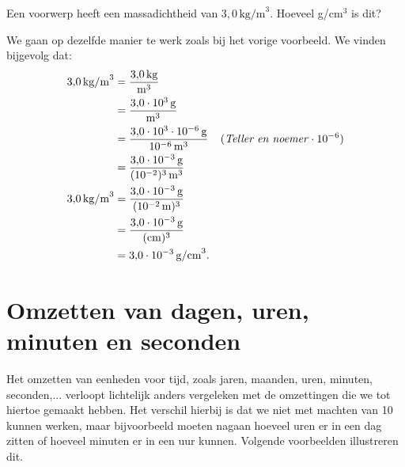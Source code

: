 \documentclass{ximera}
\begin{document}
\begin{example}[foldable=true,title={Voorbeeld: Omzetten van Massadichtheid}]\nl
    Een voorwerp heeft een massadichtheid van $3{,}0 \, \mathrm{kg/m}^{3}$. Hoeveel g/cm$^{3}$ is dit?

    \begin{solution}\nl
        We gaan op dezelfde manier te werk zoals bij het vorige voorbeeld. We vinden bijgevolg dat:
        \begin{align*}
        3{,}0 \, \mathrm{kg/m}^{3} & = \frac{3{,}0 \, \mathrm{kg}}{\mathrm{m}^{3}} \\
        & = \frac{3{,}0 \cdot 10^{3} \, \mathrm{g}}{\mathrm{m}^{3}} \\
        & = \frac{3{,}0 \cdot 10^{3} \cdot 10^{-6} \, \mathrm{g}}{10^{-6}\, \mathrm{m}^{3}} & (\text{\textit{Teller en noemer}} \cdot 10^{-6}) \\
        & = \frac{3{,}0 \cdot 10^{-3} \, \mathrm{g}}{(10^{-2})^{3} \, \mathrm{m}^{3}} \\
        3{,}0 \, \mathrm{kg/m}^{3} & = \frac{3{,}0 \cdot 10^{-3} \, \mathrm{g}}{(10^{-2} \, \mathrm{m})^{3}} \\
        & = \frac{3{,}0 \cdot 10^{-3} \, \mathrm{g}}{(\mathrm{cm})^{3}} \\
        & = 3{,}0 \cdot 10^{-3} \, \mathrm{g/cm}^{3}.
        \end{align*}
    \end{solution}
\end{example}

\section{Omzetten van dagen, uren, minuten en seconden}
Het omzetten van eenheden voor tijd, zoals jaren, maanden, uren, minuten, seconden,... verloopt lichtelijk anders vergeleken met de omzettingen die we tot hiertoe gemaakt hebben. Het verschil hierbij is dat we niet met machten van 10 kunnen werken, maar bijvoorbeeld moeten nagaan hoeveel uren er in een dag zitten of hoeveel minuten er in een uur kunnen. Volgende voorbeelden illustreren dit.
\end{document}
